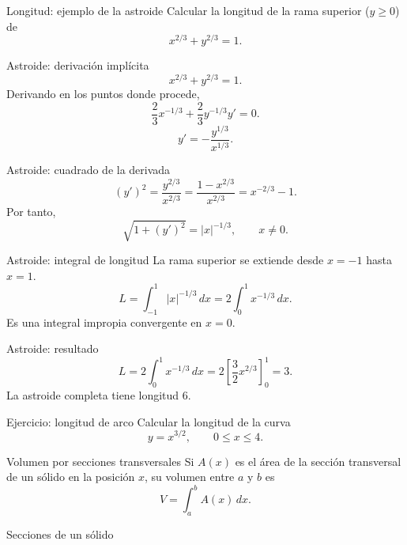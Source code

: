 \documentclass[original_version/main.tex]{subfiles}
\begin{document}
\begin{frame}{Longitud: ejemplo de la astroide}
Calcular la longitud de la rama superior ($y\ge0$) de\[x^{2/3}+y^{2/3}=1.\]
\end{frame}

\begin{frame}{Astroide: derivación implícita}
\[x^{2/3}+y^{2/3}=1.\]Derivando en los puntos donde procede,\[\frac23x^{-1/3}+\frac23y^{-1/3}y\prime=0.\]\[y\prime=-\frac{y^{1/3}}{x^{1/3}}.\]
\end{frame}

\begin{frame}{Astroide: cuadrado de la derivada}
\[(y\prime)^2=\frac{y^{2/3}}{x^{2/3}}=\frac{1-x^{2/3}}{x^{2/3}}=x^{-2/3}-1.\]Por tanto,\[\sqrt{1+(y\prime)^2}=|x|^{-1/3},\qquad x\ne0.\]
\end{frame}

\begin{frame}{Astroide: integral de longitud}
La rama superior se extiende desde $x=-1$ hasta $x=1$.\[L=\int_{-1}^1|x|^{-1/3}\,dx=2\int_0^1x^{-1/3}\,dx.\]Es una integral impropia convergente en $x=0$.
\end{frame}

\begin{frame}{Astroide: resultado}
\[L=2\int_0^1x^{-1/3}\,dx=2\left[\frac32x^{2/3}\right]_0^1=\boxed{3}.\]\footnotesize La astroide completa tiene longitud $6$.
\end{frame}

\begin{frame}{Ejercicio: longitud de arco}
Calcular la longitud de la curva\[y=x^{3/2},\qquad 0\le x\le4.\]
\end{frame}

\begin{frame}{Volumen por secciones transversales}
Si $A(x)$ es el área de la sección transversal de un sólido en la posición $x$, su volumen entre $a$ y $b$ es\[\boxed{V=\int_a^b A(x)\,dx.}\]
\end{frame}

\begin{frame}{Secciones de un sólido}
\end{frame}
\end{document}
